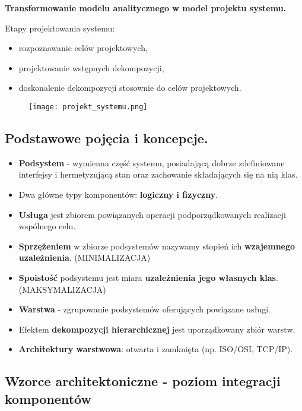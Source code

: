 \documentclass[../main.tex]{subfiles}
\begin{document}
    \textbf{Transformowanie modelu analitycznego w model projektu systemu.}

    Etapy projektowania systemu:
    \begin{itemize}
        \item rozpoznawanie celów projektowych,
        \item projektowanie wstępnych dekompozycji,
        \item doskonalenie dekompozycji stosownie do celów projektowych.
    \end{itemize}

    \begin{figure}[H]
        \texttt{[image: projekt\_systemu.png]}
    \end{figure}

    \subsection{Podstawowe pojęcia i koncepcje.}
    \begin{itemize}
        \item \textbf{Podsystem} - wymienna część systemu, posiadającą dobrze zdefiniowane interfejsy i
        hermetyzującą stan oraz zachowanie składających się na nią klas.
        \item Dwa główne typy komponentów: \textbf{logiczny i fizyczny}.
        \item \textbf{Usługa} jest zbiorem powiązanych operacji podporządkowanych realizacji wspólnego
        celu.
        \item \textbf{Sprzężeniem} w zbiorze podsystemów nazywamy stopień ich \textbf{wzajemnego uzależnienia}. (MINIMALIZACJA)
        \item \textbf{Spoistość} podsystemu jest miara \textbf{uzależnienia jego własnych klas}. (MAKSYMALIZACJA)
        \item \textbf{Warstwa} - zgrupowanie podsystemów oferujących powiązane usługi.
        \item Efektem \textbf{dekompozycji hierarchicznej} jest uporządkowany zbiór warstw.
        \item \textbf{Architektury warstwowa}: otwarta i zamknięta (np. ISO/OSI, TCP/IP).
    \end{itemize}


    \subsection{Wzorce architektoniczne - poziom integracji komponentów}
\end{document}
